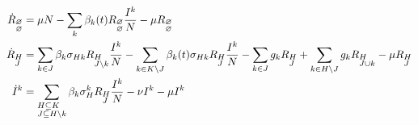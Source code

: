  \begin{footnotesize}
  \begin{align}
    \label{eq:full}
    \dot{R}_{\begin{subarray}{l}\varnothing \\ \varnothing \end{subarray}} &= \mu N -\sum_k \beta_k(t) R_{\begin{subarray}{l}\varnothing \\ \varnothing \end{subarray}} \frac{I^k}{N} - \mu R_{\begin{subarray}{l}\varnothing \\ \varnothing \end{subarray}}\\
    \dot{R}_{\begin{subarray}{l}H\\ J \end{subarray}} &= \sum_{k \in
      J} \beta_k \sigma_{Hk} R_{\begin{subarray}{l}H \\ J \setminus
        k \end{subarray}} \frac{I^k}{N} -\sum_{k \in K\setminus J} \beta_k(t)
    \sigma_{Hk} R_{\begin{subarray}{l}H\\ J \end{subarray}}
    \frac{I^k}{N} - \sum_{k \in J} g_k R_{\begin{subarray}{l}H\\
        J \end{subarray}} + \sum_{k \in H \setminus J} g_k
    R_{\begin{subarray}{l}H\\ J\cup k \end{subarray}} -\mu
    R_{\begin{subarray}{l}H\\J \end{subarray}} \notag \\
    \dot{I}^k &= \sum_{\begin{subarray}{l}H \subseteq K \\ J
        \subseteq H \setminus k  \end{subarray}} \beta_k
    \sigma_H^k R_{\begin{subarray}{l}H \\ J \end{subarray}}
    \frac{I^k}{N} -\nu I^k -\mu I^k \notag
  \end{align}
\end{footnotesize}

